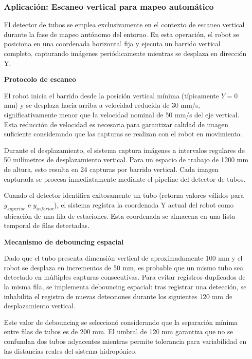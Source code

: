 \subsubsection{Aplicación: Escaneo vertical para mapeo automático}

El detector de tubos se emplea exclusivamente en el contexto de escaneo vertical durante la fase de mapeo autónomo del entorno. En esta operación, el robot se posiciona en una coordenada horizontal fija y ejecuta un barrido vertical completo, capturando imágenes periódicamente mientras se desplaza en dirección Y.

\textbf{Protocolo de escaneo}

El robot inicia el barrido desde la posición vertical mínima (típicamente $Y = 0$ mm) y se desplaza hacia arriba a velocidad reducida de 30 mm/s, significativamente menor que la velocidad nominal de 50 mm/s del eje vertical. Esta reducción de velocidad es necesaria para garantizar calidad de imagen suficiente considerando que las capturas se realizan con el robot en movimiento.

Durante el desplazamiento, el sistema captura imágenes a intervalos regulares de 50 milímetros de desplazamiento vertical. Para un espacio de trabajo de 1200 mm de altura, esto resulta en 24 capturas por barrido vertical. Cada imagen capturada se procesa inmediatamente mediante el pipeline del detector de tubos.

Cuando el detector identifica exitosamente un tubo (retorna valores válidos para $y_{superior}$ e $y_{inferior}$), el sistema registra la coordenada Y actual del robot como ubicación de una fila de estaciones. Esta coordenada se almacena en una lista temporal de filas detectadas.

\textbf{Mecanismo de debouncing espacial}

Dado que el tubo presenta dimensión vertical de aproximadamente 100 mm y el robot se desplaza en incrementos de 50 mm, es probable que un mismo tubo sea detectado en múltiples capturas consecutivas. Para evitar registros duplicados de la misma fila, se implementa debouncing espacial: tras registrar una detección, se inhabilita el registro de nuevas detecciones durante los siguientes 120 mm de desplazamiento vertical.

Este valor de debouncing se seleccionó considerando que la separación mínima entre filas de tubos es de 200 mm. El umbral de 120 mm garantiza que no se confundan dos tubos adyacentes mientras permite tolerancia para variabilidad en las distancias reales del sistema hidropónico.

